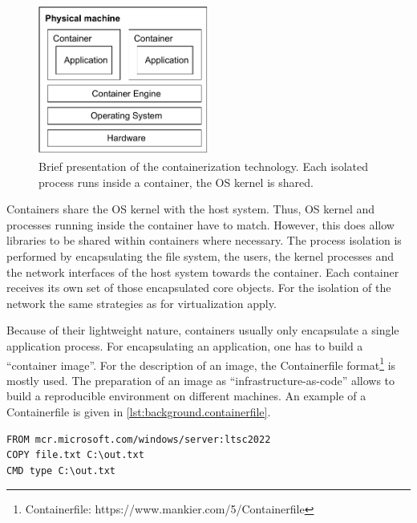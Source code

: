 \begin{figure}[h]
	\centering
	\includegraphics[width=0.5\textwidth]{Figures/containerization.pdf}
	\caption{Brief presentation of the containerization technology\cite{RamosApolinario.2021, Warrier.20201120}. Each isolated process runs inside a container, the \ac{OS} kernel is shared.}
	\label{fig:background.container}
\end{figure}

Containers share the \ac{OS} kernel with the host system.  Thus, \ac{OS} kernel and processes running inside the container have to match.
However, this does allow libraries to be shared within containers where necessary\cite{Warrier.20201120}.
The process isolation is performed by encapsulating the file system, the users, the kernel processes and the network interfaces of the host system towards the container. Each container receives its own set of those encapsulated core objects. For the isolation of the network the same strategies as for virtualization apply.

Because of their lightweight nature, containers usually only encapsulate a single application process. For encapsulating an application, one has to build a \enquote{container image}.  For the description of an image, the Containerfile format\footnote{Containerfile: https://www.mankier.com/5/Containerfile} is mostly used. The preparation of an image as \enquote{infrastructure-as-code} allows to build a reproducible environment on different machines. An example of a Containerfile is given in \autoref{lst:background.containerfile}.

\begin{lstlisting}[label=lst:background.containerfile, caption={Example of a container file. A file (file.txt) is copied to a Windows Server container (to C:\textbackslash out.txt), and this file is printed during the container run using the command.}, language=docker]
FROM mcr.microsoft.com/windows/server:ltsc2022
COPY file.txt C:\out.txt
CMD type C:\out.txt
\end{lstlisting}

